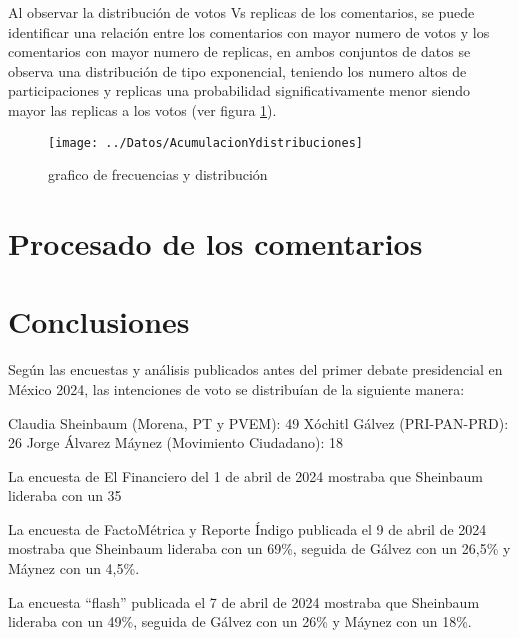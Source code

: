 Al observar la distribución de votos Vs replicas de los comentarios, se puede identificar una relación entre los comentarios con mayor numero de votos y los comentarios con mayor numero de replicas, en ambos conjuntos de datos se observa una distribución de tipo exponencial, teniendo los numero altos de participaciones y replicas una probabilidad significativamente menor siendo mayor las replicas a los votos (ver figura \ref{fig:FyD}).\\


\begin{figure}[!h]
	\centering
	\texttt{[image: ../Datos/AcumulacionYdistribuciones]}
	\caption{grafico de frecuencias y distribución}
	\label{fig:FyD}
\end{figure}

\chapter{Procesado de los comentarios}





\chapter{Conclusiones}

Según las encuestas y análisis publicados antes del primer debate presidencial en México 2024, las intenciones de voto se distribuían de la siguiente manera:

Claudia Sheinbaum (Morena, PT y PVEM): 49%
Xóchitl Gálvez (PRI-PAN-PRD): 26%
Jorge Álvarez Máynez (Movimiento Ciudadano): 18%


La encuesta de El Financiero del 1 de abril de 2024 mostraba que Sheinbaum lideraba con un 35%

La encuesta de FactoMétrica y Reporte Índigo publicada el 9 de abril de 2024 mostraba que Sheinbaum lideraba con un 69\%, seguida de Gálvez con un 26,5\% y Máynez con un 4,5\%.

La encuesta “flash” publicada el 7 de abril de 2024 mostraba que Sheinbaum lideraba con un 49\%, seguida de Gálvez con un 26\% y Máynez con un 18\%.